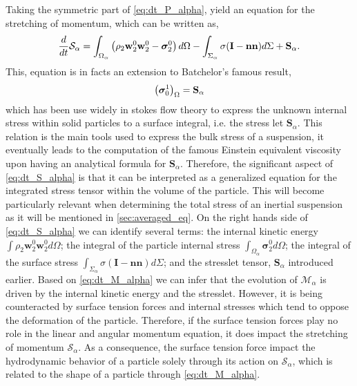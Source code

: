 Taking the symmetric part of \ref{eq:dt_P_alpha}, yield an equation for the stretching of momentum, which can be written as,
\begin{equation}    
    \frac{d}{d t} \mathcal{S}_\alpha
    =  \int_{\Omega_\alpha} \left(
        \rho_2\textbf{w}_2^0 \textbf{w}_2^0
        - \bm{\sigma}_2^0
        \right) d\Omega
        - \int_{\Sigma_\alpha} 
        \sigma (\textbf{I}-\textbf{nn})
        d\Sigma
        + \textbf{S}_\alpha.
    \label{eq:dt_S_alpha}
\end{equation}
This, equation is in facts an extension to Batchelor’s famous result, 
\begin{equation*}
    \left( \bm{\sigma}_0^1 \right)_\Omega
    = \textbf{S}_\alpha
\end{equation*}
which has been use widely in stokes flow theory to express the unknown internal stress within solid particles to a surface integral, i.e. the stress let $\textbf{S}_\alpha$.
This relation is the main tools used to express the bulk stress of a suspension, it eventually leads to the computation of the famous Einstein equivalent viscosity upon having an analytical formula for $\textbf{S}_\alpha$. 
Therefore, the significant aspect of \ref{eq:dt_S_alpha} is that it can be interpreted as a generalized equation for the integrated stress tensor within the volume of the particle.
This will become particularly relevant when determining the total stress of an inertial suspension as it will be mentioned in \ref{sec:averaged_eq}.
On the right hands side of \ref{eq:dt_S_alpha} we can identify several terms: 
the internal kinetic energy $\int \rho_2\textbf{w}_2^0\textbf{w}_2^0 d\Omega$; 
the integral of the particle internal stress $\int_{\Omega_\alpha} \bm{\sigma}_2^0
 d\Omega$; 
the integral of the surface stress $\int_{\Sigma_\alpha} \sigma (\textbf{I}- \textbf{nn}) d\Sigma$; 
and the stresslet tensor, $\textbf{S}_\alpha$ introduced earlier.
Based on \ref{eq:dt_M_alpha} we can infer that the evolution of $\mathcal{M}_\alpha$ is driven by the internal kinetic energy and the stresslet.
However, it is being counteracted by surface tension forces and internal stresses which tend to oppose the deformation of the particle. 
Therefore, if the surface tension forces play no role in the linear and angular momentum equation, it does impact the stretching of momentum $\mathcal{S}_\alpha$.
As a consequence, the surface tension force impact the hydrodynamic behavior of a particle solely through its action on $\mathcal{S}_\alpha$, which is related to the shape of a particle through \ref{eq:dt_M_alpha}.
